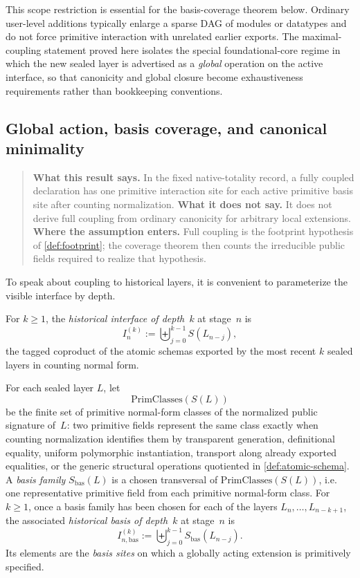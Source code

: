 \documentclass{lmcs}
\newcommand{\PrimClasses}{\mathrm{PrimClasses}}
\begin{document}
This scope restriction is essential for the basis-coverage theorem below. Ordinary user-level additions typically enlarge a sparse DAG of modules or datatypes and do not force primitive interaction with unrelated earlier exports. The maximal-coupling statement proved here isolates the special foundational-core regime in which the new sealed layer is advertised as a \emph{global} operation on the active interface, so that canonicity and global closure become exhaustiveness requirements rather than bookkeeping conventions.

\subsection{Global action, basis coverage, and canonical minimality}

\begin{quote}
\small
\textbf{What this result says.}
In the fixed native-totality record, a fully coupled declaration has one
primitive interaction site for each active primitive basis site after counting
normalization.
\textbf{What it does not say.}
It does not derive full coupling from ordinary canonicity for arbitrary local
extensions.
\textbf{Where the assumption enters.}
Full coupling is the footprint hypothesis of \autoref{def:footprint}; the
coverage theorem then counts the irreducible public fields required to realize
that hypothesis.
\end{quote}

To speak about coupling to historical layers, it is convenient to parameterize the visible interface by depth.

\begin{defi}
\label{def:historical-interface}
For $k \geq 1$, the \emph{historical interface of depth~$k$} at stage~$n$ is
\[
  I_n^{(k)} := \biguplus_{j=0}^{k-1} S(L_{n-j}),
\]
the tagged coproduct of the atomic schemas exported by the most recent $k$ sealed layers in counting normal form.
\end{defi}

\begin{defi}
\label{def:basis-sites}
For each sealed layer $L$, let
\[
  \PrimClasses(S(L))
\]
be the finite set of primitive normal-form classes of the normalized public signature of~$L$: two primitive fields represent the same class exactly when counting normalization identifies them by transparent generation, definitional equality, uniform polymorphic instantiation, transport along already exported equalities, or the generic structural operations quotiented in \autoref{def:atomic-schema}. A \emph{basis family} $S_{\mathrm{bas}}(L)$ is a chosen transversal of $\PrimClasses(S(L))$, i.e. one representative primitive field from each primitive normal-form class. For $k \geq 1$, once a basis family has been chosen for each of the layers $L_n,\dots,L_{n-k+1}$, the associated \emph{historical basis of depth~$k$} at stage~$n$ is
\[
  I_{n,\mathrm{bas}}^{(k)} := \biguplus_{j=0}^{k-1} S_{\mathrm{bas}}(L_{n-j}).
\]
Its elements are the \emph{basis sites} on which a globally acting extension is
primitively specified.
\end{defi}
\end{document}
